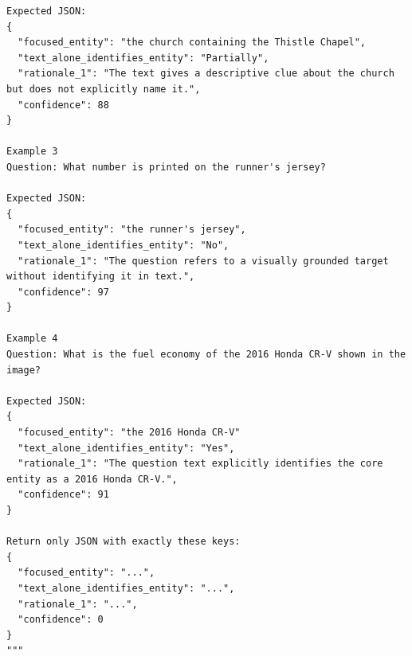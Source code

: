 \begin{verbatim}
Expected JSON:
{
  "focused_entity": "the church containing the Thistle Chapel",
  "text_alone_identifies_entity": "Partially",
  "rationale_1": "The text gives a descriptive clue about the church but does not explicitly name it.",
  "confidence": 88
}

Example 3
Question: What number is printed on the runner's jersey?

Expected JSON:
{
  "focused_entity": "the runner's jersey",
  "text_alone_identifies_entity": "No",
  "rationale_1": "The question refers to a visually grounded target without identifying it in text.",
  "confidence": 97
}

Example 4
Question: What is the fuel economy of the 2016 Honda CR-V shown in the image?

Expected JSON:
{
  "focused_entity": "the 2016 Honda CR-V"
  "text_alone_identifies_entity": "Yes",
  "rationale_1": "The question text explicitly identifies the core entity as a 2016 Honda CR-V.",
  "confidence": 91
}

Return only JSON with exactly these keys:
{
  "focused_entity": "...",
  "text_alone_identifies_entity": "...",
  "rationale_1": "...",
  "confidence": 0
}
"""
\end{verbatim}

